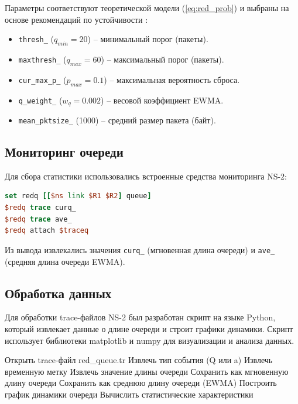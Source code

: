 \documentclass[10pt, conference, twocolumn, a4paper]{article}
\begin{document}
Параметры соответствуют теоретической модели (\ref{eq:red_prob}) и выбраны на основе рекомендаций по устойчивости \cite{velieva2019phd}:
\begin{itemize}
    \item \texttt{thresh\_} ($q_{min}=20$) -- минимальный порог (пакеты).
    \item \texttt{maxthresh\_} ($q_{max}=60$) -- максимальный порог (пакеты).
    \item \texttt{cur\_max\_p\_} ($p_{max}=0.1$) -- максимальная вероятность сброса.
    \item \texttt{q\_weight\_} ($w_q=0.002$) -- весовой коэффициент EWMA.
    \item \texttt{mean\_pktsize\_} (1000) -- средний размер пакета (байт).
\end{itemize}

\subsection{Мониторинг очереди}
Для сбора статистики использовались встроенные средства мониторинга NS-2:

\begin{lstlisting}[language=tcl, caption=Мониторинг очереди в NS-2]
set redq [[$ns link $R1 $R2] queue]
$redq trace curq_
$redq trace ave_
$redq attach $traceq
\end{lstlisting}

Из вывода извлекались значения \texttt{curq\_} (мгновенная длина очереди) и \texttt{ave\_} (средняя длина очереди EWMA).

\subsection{Обработка данных}
Для обработки trace-файлов NS-2 был разработан скрипт на языке Python, который извлекает данные о длине очереди и строит графики динамики. Скрипт использует библиотеки matplotlib и numpy для визуализации и анализа данных.

\begin{algorithm}
\caption{Алгоритм обработки trace-файла NS-2}
\begin{algorithmic}[1]
\STATE Открыть trace-файл red\_queue.tr
    \STATE Извлечь тип события (Q или a)
    \STATE Извлечь временную метку
    \STATE Извлечь значение длины очереди
        \STATE Сохранить как мгновенную длину очереди
        \STATE Сохранить как среднюю длину очереди (EWMA)
    \ENDIF
\ENDFOR
\STATE Построить график динамики очереди
\STATE Вычислить статистические характеристики
\end{algorithmic}
\end{algorithm}
\end{document}
